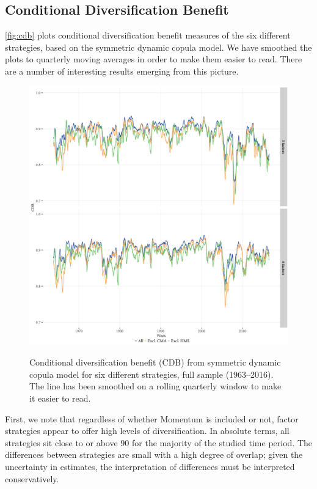 
\subsection{Conditional Diversification Benefit} %
\label{sub:conditional_diversification_benefit}

\autoref{fig:cdb} plots conditional diversification benefit measures of the six different strategies, based on the symmetric dynamic copula model. We have smoothed the plots to quarterly moving averages in order to make them easier to read. There are a number of interesting results emerging from this picture.

\begin{figure}
  \caption{Conditional diversification benefit (CDB) from symmetric dynamic copula model for six different strategies, full sample (1963--2016). The line has been smoothed on a rolling quarterly window to make it easier to read.}
  \includegraphics[width=\textwidth]{graphics/cdb_5F_6F.png}
  \label{fig:cdb}
\end{figure}

First, we note that regardless of whether Momentum is included or not, factor strategies appear to offer high levels of diversification. In absolute terms, all strategies sit close to or above $90$ for the majority of the studied time period. The differences between strategies are small with a high degree of overlap; given the uncertainty in estimates, the interpretation of differences must be interpreted conservatively.

